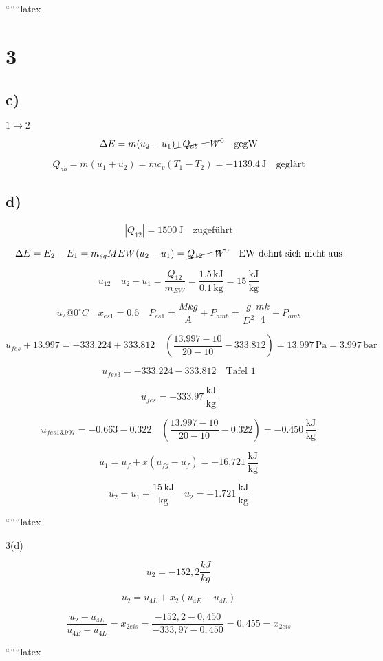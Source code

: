 ``````latex


\section*{3}
\subsection*{c)}
\(1 \rightarrow 2\)

\[
\Delta E = m(u_2 - u_1) \cancel{+ Q_{ab} - W}^0 \quad \text{gegW}
\]

\[
Q_{ab} = m(u_1 + u_2) = mc_v(T_1 - T_2) = -1139.4 \, \text{J} \quad \text{geglärt}
\]

\subsection*{d)}
\[
\left| Q_{12} \right| = 1500 \, \text{J} \quad \text{zugeführt}
\]

\[
\Delta E = E_2 - E_1 = m_{eq} MEW (u_2 - u_1) = \cancel{Q_{12} - W}^0 \quad \text{EW dehnt sich nicht aus}
\]

\[
u_{12} \quad u_2 - u_1 = \frac{Q_{12}}{m_{EW}} = \frac{1.5 \, \text{kJ}}{0.1 \, \text{kg}} = 15 \, \frac{\text{kJ}}{\text{kg}}
\]

\[
u_2 @ 0^\circ C \quad x_{es1} = 0.6 \quad P_{es1} = \frac{M k g}{A} + P_{amb} = \frac{g}{D^2} \frac{mk}{4} + P_{amb}
\]

\[
u_{fes} + 13.997 = -333.224 + 333.812 \quad \left( \frac{13.997 - 10}{20 - 10} - 333.812 \right) = 13.997 \, \text{Pa} = 3.997 \, \text{bar}
\]

\[
u_{fes3} = -333.224 - 333.812 \quad \text{Tafel 1}
\]

\[
u_{fes} = -333.97 \, \frac{\text{kJ}}{\text{kg}}
\]

\[
u_{fes13.997} = -0.663 - 0.322 \quad \left( \frac{13.997 - 10}{20 - 10} - 0.322 \right) = -0.450 \, \frac{\text{kJ}}{\text{kg}}
\]

\[
u_1 = u_f + x(u_{fg} - u_f) = -16.721 \, \frac{\text{kJ}}{\text{kg}}
\]

\[
u_2 = u_1 + \frac{15 \, \text{kJ}}{\text{kg}} \quad u_2 = -1.721 \, \frac{\text{kJ}}{\text{kg}}
\]

``````latex

3(d)

\[
u_2 = -152,2 \frac{kJ}{kg}
\]

\[
u_2 = u_{4L} + x_2 (u_{4E} - u_{4L})
\]

\[
\frac{u_2 - u_{4L}}{u_{4E} - u_{4L}} = x_{2eis} = \frac{-152,2 - 0,450}{-333,97 - 0,450} = 0,455 = x_{2eis}
\]

``````latex


